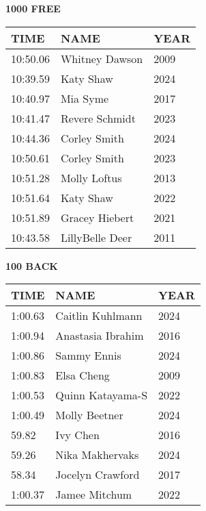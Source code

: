 \begin{minipage}[t]{0.48\textwidth}
\centering
\textbf{1000 FREE}\\[0.05cm]
\begin{tabular}{@{}p{1.8cm}p{2.8cm}p{1.2cm}@{}}
\hline
\textbf{TIME} & \textbf{NAME} & \textbf{YEAR} \\
\hline
10:50.06 & Whitney Dawson & 2009 \\
10:39.59 & Katy Shaw & 2024 \\
10:40.97 & Mia Syme & 2017 \\
10:41.47 & Revere Schmidt & 2023 \\
10:44.36 & Corley Smith & 2024 \\
10:50.61 & Corley Smith & 2023 \\
10:51.28 & Molly Loftus & 2013 \\
10:51.64 & Katy Shaw & 2022 \\
10:51.89 & Gracey Hiebert & 2021 \\
10:43.58 & LillyBelle Deer & 2011 \\
\hline
\end{tabular}
\end{minipage}\hfill
\begin{minipage}[t]{0.48\textwidth}
\centering
\textbf{100 BACK}\\[0.05cm]
\begin{tabular}{@{}p{1.8cm}p{2.8cm}p{1.2cm}@{}}
\hline
\textbf{TIME} & \textbf{NAME} & \textbf{YEAR} \\
\hline
1:00.63 & Caitlin Kuhlmann & 2024 \\
1:00.94 & Anastasia Ibrahim & 2016 \\
1:00.86 & Sammy Ennis & 2024 \\
1:00.83 & Elsa Cheng & 2009 \\
1:00.53 & Quinn Katayama-S & 2022 \\
1:00.49 & Molly Beetner & 2024 \\
59.82 & Ivy Chen & 2016 \\
59.26 & Nika Makhervaks & 2024 \\
58.34 & Jocelyn Crawford & 2017 \\
1:00.37 & Jamee Mitchum & 2022 \\
\hline
\end{tabular}
\end{minipage}

\vspace{0.4cm}

